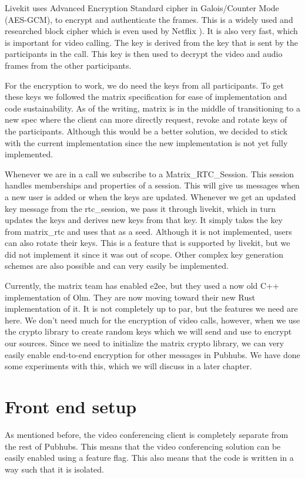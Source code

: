 \documentclass{report}
\begin{document}
Livekit uses Advanced Encryption Standard cipher in Galois/Counter Mode (AES-GCM), to encrypt and authenticate the
frames. This is a widely used and researched block cipher which is even used by Netflix 
).
It is also very fast, which is important for video calling. The key is derived from the key that is sent by the
participants in the call. This key is then used to decrypt the video and audio frames from the other participants.


For the encryption to work, we do need the keys from all participants. To get these keys we followed the matrix
specification for ease of implementation and code sustainability. As of the writing, matrix is in the middle of
transitioning to a
new spec where the client can more directly request, revoke and rotate keys of the participants. Although this would
be a better solution, we decided to stick with the current implementation since the new implementation is not yet
fully implemented.

Whenever we are in a call we subscribe to a Matrix\_RTC\_Session. This session handles memberships and
properties of a session. This will give us messages when a new user is added or when the keys are updated.
Whenever we get an updated key message from the rtc\_session, we pass it through livekit, which in turn updates
the keys and derives new keys from that key. It simply takes the key from matrix\_rtc and uses
that as a seed. Although it is not implemented, users can also rotate their keys. This is a feature that is
supported by livekit, but we did not implement it since it was out of scope. Other complex key generation schemes
are also possible and can very easily be implemented.

Currently, the matrix team has enabled e2ee, but they used a now old C++ implementation of Olm. They are now moving
toward their new Rust implementation of it. It is not completely up to par, but the features we need are here. We
don't need much for the encryption of video calls, however, when we use the crypto library to create random keys
which we will send and use to encrypt our sources. Since we need to initialize the matrix crypto library, we can
very easily enable end-to-end encryption for other messages in Pubhubs. We have done some experiments with this,
which we will discuss in a later chapter.


\section{Front end setup}
As mentioned before, the video conferencing client is completely separate from the rest of Pubhubs. This means that
the video conferencing solution can be easily enabled using a feature flag. This also means that the code is
written in a way such that it is isolated.
\end{document}
